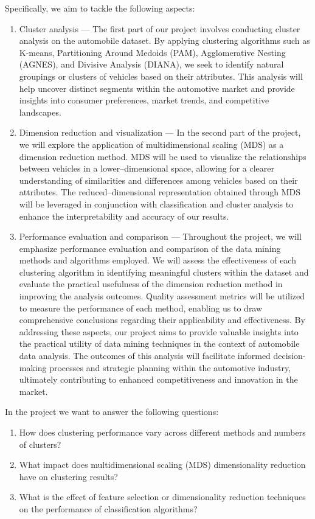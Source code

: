 \documentclass[11pt,a4paper]{article}\usepackage[]{graphicx}\usepackage[]{xcolor}
\begin{document}
Specifically, we aim to tackle the following aspects:
\begin{enumerate}
\item Cluster analysis --- The first part of our project involves conducting cluster analysis on the automobile dataset. By applying clustering algorithms such as K-means, Partitioning Around Medoids (PAM), Agglomerative Nesting (AGNES), and Divisive Analysis (DIANA), we seek to identify natural groupings or clusters of vehicles based on their attributes. This analysis will help uncover distinct segments within the automotive market and provide insights into consumer preferences, market trends, and competitive landscapes.
\item Dimension reduction and visualization --- In the second part of the project, we will explore the application of multidimensional scaling (MDS) as a dimension reduction method. MDS will be used to visualize the relationships between vehicles in a lower--dimensional space, allowing for a clearer understanding of similarities and differences among vehicles based on their attributes. The reduced--dimensional representation obtained through MDS will be leveraged in conjunction with classification and cluster analysis to enhance the interpretability and accuracy of our results.
\item Performance evaluation and comparison --- Throughout the project, we will emphasize performance evaluation and comparison of the data mining methods and algorithms employed. We will assess the effectiveness of each clustering algorithm in identifying meaningful clusters within the dataset and evaluate the practical usefulness of the dimension reduction method in improving the analysis outcomes. Quality assessment metrics will be utilized to measure the performance of each method, enabling us to draw comprehensive conclusions regarding their applicability and effectiveness.
By addressing these aspects, our project aims to provide valuable insights into the practical utility of data mining techniques in the context of automobile data analysis. The outcomes of this analysis will facilitate informed decision-making processes and strategic planning within the automotive industry, ultimately contributing to enhanced competitiveness and innovation in the market.
\end{enumerate}

In the project we want to answer the following questions:
\begin{enumerate}
\item How does clustering performance vary across different methods and numbers of clusters?
\item What impact does multidimensional scaling (MDS) dimensionality reduction have on clustering results?
\item What is the effect of feature selection or dimensionality reduction techniques on the performance of classification algorithms?
\end{enumerate}
\end{document}
